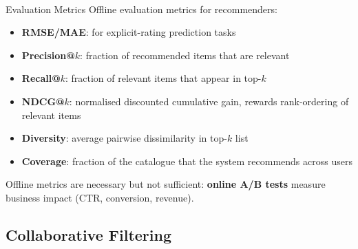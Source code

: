 \begin{v3topic}{Evaluation Metrics}
    Offline evaluation metrics for recommenders\textsuperscript{\cite[][pp.~20--28]{aggarwalRecommenderSystems2016}}:
    \begin{itemize}
        \item \textbf{RMSE/MAE}: for explicit-rating prediction tasks
        \item \textbf{Precision@$k$}: fraction of recommended items that are relevant
        \item \textbf{Recall@$k$}: fraction of relevant items that appear in top-$k$
        \item \textbf{NDCG@$k$}: normalised discounted cumulative gain, rewards rank-ordering of relevant items
        \item \textbf{Diversity}: average pairwise dissimilarity in top-$k$ list
        \item \textbf{Coverage}: fraction of the catalogue that the system recommends across users
    \end{itemize}
    Offline metrics are necessary but not sufficient: \textbf{online A/B tests} measure business impact (CTR, conversion, revenue).

\end{v3topic}

\subsection{Collaborative Filtering}



